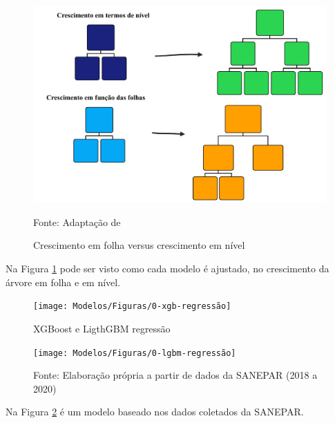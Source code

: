 \begin{figure}[H]
	\centering
	\caption{Crescimento em folha versus crescimento em nível}
	\label{fig:xgboost}
	\includegraphics[width=0.7\linewidth]{Modelos/Figuras/xgboost}
	
	Fonte: Adaptação de 
\end{figure}


Na Figura \ref{fig:xgboost} pode ser visto como cada modelo é ajustado, no crescimento da árvore em folha e em nível.

\begin{figure}[H]
	\centering
	\caption{XGBoost e LigthGBM regressão}\label{fig:1-xgb-regressao}
	\texttt{[image: Modelos/Figuras/0-xgb-regressão]}
	
\end{figure}
	
\begin{figure}[H]
	\centering
	\texttt{[image: Modelos/Figuras/0-lgbm-regressão]}	
	
	
	Fonte: Elaboração própria a partir de dados da SANEPAR (2018 a 2020)

\end{figure}

Na Figura \ref{fig:1-xgb-regressao} é um modelo baseado nos dados coletados da SANEPAR.

